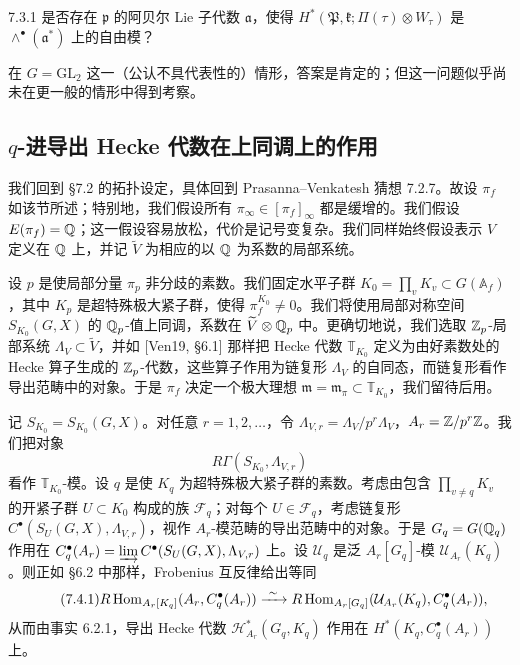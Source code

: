 \begin{ques}{7.3.1}\label{thm:a6-05-4}
是否存在 $\mathfrak p$ 的阿贝尔 Lie 子代数 $\mathfrak a$，使得 $H^*(\mathfrak P,\mathfrak k;\Pi(\tau)\otimes W_\tau)$ 是 $\wedge^\bullet(\mathfrak a^*)$ 上的自由模？
\end{ques}

在 $G=\mathrm{GL}_2$ 这一（公认不具代表性的）情形，答案是肯定的；但这一问题似乎尚未在更一般的情形中得到考察。

\subsection{$q$-进导出 Hecke 代数在上同调上的作用}

我们回到 §7.2 的拓扑设定，具体回到 Prasanna--Venkatesh 猜想 7.2.7。故设 $\pi_f$ 如该节所述；特别地，我们假设所有 $\pi_\infty\in[\pi_f]_\infty$ 都是缓增的。我们假设 $E(\pi_f)=\mathbb{Q}$；这一假设容易放松，代价是记号变复杂。我们同样始终假设表示 $V$ 定义在 $\mathbb{Q}$ 上，并记 $\widetilde V$ 为相应的以 $\mathbb{Q}$ 为系数的局部系统。

设 $p$ 是使局部分量 $\pi_p$ 非分歧的素数。我们固定水平子群 $K_0=\prod_v K_v\subset G(\mathbb A_f)$，其中 $K_p$ 是超特殊极大紧子群，使得 $\pi_f^{K_0}\ne0$。我们将使用局部对称空间 $S_{K_0}(G,X)$ 的 $\mathbb{Q}_p$-值上同调，系数在 $\widetilde V\otimes\mathbb{Q}_p$ 中。更确切地说，我们选取 $\mathbb{Z}_p$-局部系统 $\Lambda_V\subset\widetilde V$，并如 [Ven19, §6.1] 那样把 Hecke 代数 $\mathbb T_{K_0}$ 定义为由好素数处的 Hecke 算子生成的 $\mathbb{Z}_p$-代数，这些算子作用为链复形 $\Lambda_V$ 的自同态，而链复形看作导出范畴中的对象。于是 $\pi_f$ 决定一个极大理想 $\mathfrak m=\mathfrak m_\pi\subset\mathbb T_{K_0}$，我们留待后用。

记 $S_{K_0}=S_{K_0}(G,X)$。对任意 $r=1,2,\dots$，令 $\Lambda_{V,r}=\Lambda_V/p^r\Lambda_V$，$A_r=\mathbb{Z}/p^r\mathbb{Z}$。我们把对象
\[
R\Gamma(S_{K_0},\Lambda_{V,r})
\]
看作 $\mathbb T_{K_0}$-模。设 $q$ 是使 $K_q$ 为超特殊极大紧子群的素数。考虑由包含 $\prod_{v\ne q}K_v$ 的开紧子群 $U\subset K_0$ 构成的族 $\mathcal F_q$；对每个 $U\in\mathcal F_q$，考虑链复形 $C^\bullet(S_U(G,X),\Lambda_{V,r})$，视作 $A_r$-模范畴的导出范畴中的对象。于是 $G_q=G(\mathbb{Q}_q)$ 作用在 $C^\bullet_q(A_r)=\varinjlim C^\bullet(S_U(G,X),\Lambda_{V,r})$ 上。设 $\mathcal U_q$ 是泛 $A_r[G_q]$-模 $\mathcal U_{A_r}(K_q)$。则正如 §6.2 中那样，Frobenius 互反律给出等同
\begin{equation}\tag{7.4.1}\label{eq:a6-05-4}
R\operatorname{Hom}_{A_r[K_q]}(A_r,C^\bullet_q(A_r))\xrightarrow{\ \sim\ } R\operatorname{Hom}_{A_r[G_q]}(\mathcal U_{A_r}(K_q),C^\bullet_q(A_r)),
\end{equation}
从而由事实 6.2.1，导出 Hecke 代数 $\mathcal H^*_{A_r}(G_q,K_q)$ 作用在 $H^*(K_q,C^\bullet_q(A_r))$ 上。

